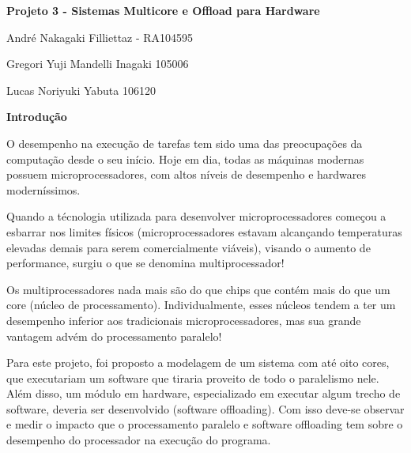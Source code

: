 \documentclass[10pt,a4paper]{report}
\begin{document}


\begin{center}
\textbf{\huge Projeto 3 - Sistemas Multicore e Offload para Hardware}
\newline
\newline
\end{center}


\begin{flushright}
\large
André Nakagaki Filliettaz - RA104595

Gregori Yuji Mandelli Inagaki 105006

Lucas Noriyuki Yabuta 106120
\end{flushright}

\begin{Large}
\textbf{Introdução}
\newline
\end{Large}

    O desempenho na execução de tarefas tem sido uma das preocupações da computação desde o seu início. Hoje em dia, todas as máquinas modernas possuem microprocessadores, com altos níveis de desempenho e hardwares moderníssimos.
    
    Quando a técnologia utilizada para desenvolver microprocessadores começou a esbarrar nos limites físicos (microprocessadores estavam alcançando temperaturas elevadas demais para serem comercialmente viáveis), visando o aumento de performance, surgiu o que se denomina multiprocessador!
    
    Os multiprocessadores nada mais são do que chips que contém mais do que um core (núcleo de processamento). Individualmente, esses núcleos tendem a ter um desempenho inferior aos tradicionais microprocessadores, mas sua grande vantagem advém do processamento paralelo!
    
    Para este projeto, foi proposto a modelagem de um sistema com até oito cores, que executariam um software que tiraria proveito de todo o paralelismo nele. Além disso, um módulo em hardware, especializado em executar algum trecho de software, deveria ser desenvolvido (software offloading). Com isso deve-se observar e medir o impacto que o processamento paralelo e software offloading tem sobre o desempenho do processador na execução do programa.
\newline
\newline
\end{document}
